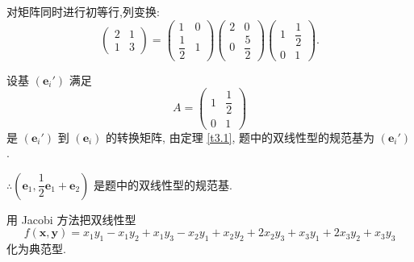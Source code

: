 \documentclass[color=black,device=normal,lang=cn,mode=geye]{elegantnote}
\begin{document}
\begin{solution}
    对矩阵同时进行初等行,列变换:
    \[\begin{pmatrix}
            2 & 1 \\
            1 & 3
        \end{pmatrix}=\begin{pmatrix}
            1 & 0 \\
            \dfrac{1}{2} & 1
        \end{pmatrix}\begin{pmatrix}
            2 & 0 \\
            0 & \dfrac{5}{2}
        \end{pmatrix}\begin{pmatrix}
            1 & \dfrac{1}{2} \\
            0 & 1
        \end{pmatrix}.\]

        设基 $(\boldsymbol{e}_i')$ 满足
        \[A=\begin{pmatrix}
            1 & \dfrac{1}{2} \\
            0 & 1
        \end{pmatrix}\]
        是 $(\boldsymbol{e}_i')$ 到 $(\boldsymbol{e}_i)$ 的转换矩阵, 由定理 \ref{t3.1}, 题中的双线性型的规范基为 $(\boldsymbol{e}_i')$.

        $\therefore\left(\boldsymbol{e}_1,\dfrac{1}{2}\boldsymbol{e}_1+\boldsymbol{e}_2\right)$ 是题中的双线性型的规范基.
\end{solution}
\begin{exercisec}[1.7.3]
    用 Jacobi 方法把双线性型
    \[f(\boldsymbol{x},\boldsymbol{y})=x_1y_1-x_1y_2+x_1y_3-x_2y_1+x_2y_2+2x_2y_3+x_3y_1+2x_3y_2+x_3y_3\]
    化为典范型.
\end{exercisec}
\end{document}
